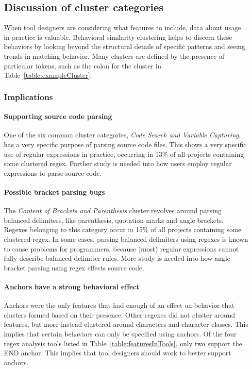 \subsection{Discussion of cluster categories}
When tool designers are considering what features to include, data about usage in practice is valuable.  Behavioral similarity clustering  helps to discern these behaviors by looking beyond the structural details of specific patterns and seeing trends in  matching behavior. Many clusters are defined by the presence of particular tokens, such as the colon for the cluster in Table~\ref{table:exampleCluster}.

\subsubsection{Implications}

\paragraph{Supporting source code parsing}  One of the six common cluster categories, \emph{Code Search and Variable Capturing}, has a very specific purpose of parsing source code files. This shows a very specific use of regular expressions in practice, occurring in 13\% of all projects containing some clustered regex.  Further study is needed into how users employ regular expressions to parse source code.

\paragraph{Possible bracket parsing bugs} The \emph{Content of Brackets and Parenthesis} cluster revolves around parsing balanced delimiters, like parenthesis, quotation marks and angle brackets.  Regexes belonging to this category occur in 15\% of all projects containing some clustered regex.  In some cases, parsing balanced delimiters using regexes is known to cause problems for programmers, because (most) regular expressions cannot fully describe balanced delimiter rules.  More study is needed into how angle bracket parsing using regex effects source code.

\paragraph{Anchors have a strong behavioral effect}  Anchors were the only features that had enough of an effect on behavior that clusters formed based on their presence.  Other regexes did not cluster around features, but more instead clustered around characters and character classes.  This implies that certain behaviors can only be specified using anchors.  Of the four regex analysis tools listed in Table~\ref{table:featuresInTools}, only two support the END anchor.  This implies that tool designers should work to better support anchors.

